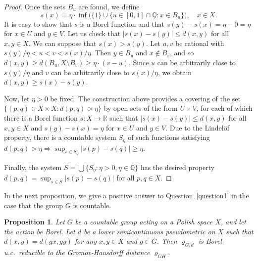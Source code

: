 \documentclass[a4paper]{amsart}
\theoremstyle{plain}
\newtheorem{proposition}[theorem]{Proposition}
\theoremstyle{remark}
\begin{document}
\begin{proof}
Once the sets $ B_{u} $ are found, we define
$$ s(x) = \eta \cdot \inf \big( \{ 1 \} \cup \{ u \in [0, 1] \cap \mathbb{Q} : x \in B_{u} \} \big), \quad x \in X. $$
It is easy to show that $ s $ is a Borel function and that $ s(y) - s(x) = \eta - 0 = \eta $ for $ x \in U $ and $ y \in V $. Let us check that $ |s(x) - s(y)| \leq d(x, y) $ for all $ x, y \in X $. We can suppose that $ s(x) > s(y) $. Let $ u, v $ be rational with $ s(y)/\eta < u < v < s(x)/\eta $. Then $ y \in B_{u} $ and $ x \notin B_{v} $, and so $ d(x, y) \geq d(B_{u}, X \setminus B_{v}) \geq \eta \cdot (v - u) $. Since $ u $ can be arbitrarily close to $ s(y)/\eta $ and $ v $ can be arbitrarily close to $ s(x)/\eta $, we obtain $ d(x, y) \geq s(x) - s(y) $.

Now, let $ \eta > 0 $ be fixed. The construction above provides a covering of the set $ \{ (p, q) \in X \times X : d(p, q) > \eta \} $ by open sets of the form $ U \times V $, for each of which there is a Borel function $ s : X \to \mathbb{R} $ such that $ |s(x) - s(y)| \leq d(x, y) $ for all $ x, y \in X $ and $ s(y) - s(x) = \eta $ for $ x \in U $ and $ y \in V $. Due to the Lindel\"{o}f property, there is a countable system $ S_{\eta} $ of such functions satisfying $ d(p, q) > \eta \Rightarrow \sup_{s \in S_{\eta}} |s(p) - s(q)| \geq \eta $.

Finally, the system $ S = \bigcup \{ S_{\eta} : \eta > 0, \eta \in \mathbb{Q} \} $ has the desired property $ d(p, q) = \sup_{s \in S} |s(p) - s(q)| $ for all $ p, q \in X $.
\end{proof}


In the next proposition, we give a positive answer to Question~\ref{question1} in the case that the group $ G $ is countable.


\begin{proposition} \label{propcountgrp}
Let $ G $ be a countable group acting on a Polish space $ X $, and let the action be Borel. Let $ d $ be a lower semicontinuous pseudometric on $ X $ such that $ d(x, y) = d(gx, gy) $ for any $ x, y \in X $ and $ g \in G $. Then $ \varrho_{G, d} $ is Borel-u.c.~reducible to the Gromov-Hausdorff distance $ \varrho_{GH} $.
\end{proposition}
\end{document}
